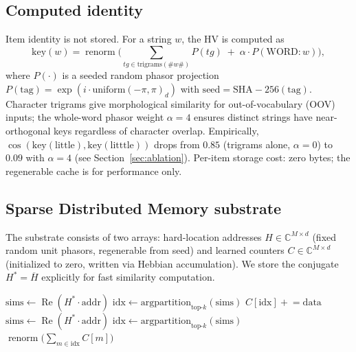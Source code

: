 \documentclass[11pt,a4paper]{article}
\begin{document}
\subsection{Computed identity}
Item identity is not stored.  For a string $w$, the HV is computed as
\begin{equation}
  \mathrm{key}(w) = \operatorname{renorm}\!\Big(
    \!\!\sum_{tg \in \mathrm{trigrams}(\#w\#)} P(tg)
    \;+\; \alpha \cdot P(\mathrm{WORD}{:}w)
  \Big),
  \label{eq:key}
\end{equation}
where $P(\cdot)$ is a seeded random phasor projection
$P(\mathrm{tag}) = \exp(i \cdot \mathrm{uniform}(-\pi, \pi)_d)$ with
$\mathrm{seed} = \mathrm{SHA{-}256}(\mathrm{tag})$.  Character trigrams
give morphological similarity for out-of-vocabulary (OOV) inputs;  the
whole-word phasor weight $\alpha = 4$ ensures distinct strings have
near-orthogonal keys regardless of character overlap.  Empirically,
$\cos(\mathrm{key}(\text{little}), \mathrm{key}(\text{litttle}))$ drops
from $0.85$ (trigrams alone, $\alpha = 0$) to $0.09$ with $\alpha = 4$
(see Section~\ref{sec:ablation}).  Per-item storage cost: zero bytes;
the regenerable cache is for performance only.

\subsection{Sparse Distributed Memory substrate}
The substrate consists of two arrays: hard-location addresses
$H \in \mathbb{C}^{M \times d}$ (fixed random unit phasors, regenerable
from seed) and learned counters $C \in \mathbb{C}^{M \times d}$
(initialized to zero, written via Hebbian accumulation).  We store the
conjugate $H^* = \overline{H}$ explicitly for fast similarity computation.

\begin{algorithm}[t]
\caption{SDM write and read}
\label{alg:sdm}
\begin{algorithmic}[1]
    \State $\mathrm{sims} \gets \operatorname{Re}(H^* \cdot \mathrm{addr})$
    \State $\mathrm{idx} \gets \mathrm{argpartition}_{\text{top-}k}(\mathrm{sims})$
    \State $C[\mathrm{idx}] \mathrel{+}= \mathrm{data}$
  \EndFunction
    \State $\mathrm{sims} \gets \operatorname{Re}(H^* \cdot \mathrm{addr})$
    \State $\mathrm{idx} \gets \mathrm{argpartition}_{\text{top-}k}(\mathrm{sims})$
    \State \Return $\operatorname{renorm}\big(\textstyle\sum_{m \in \mathrm{idx}} C[m]\big)$
  \EndFunction
\end{algorithmic}
\end{algorithm}
\end{document}
